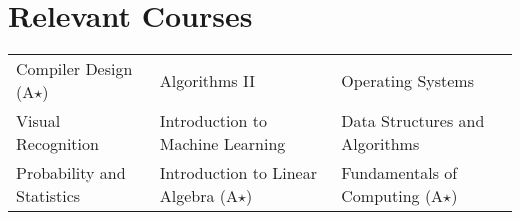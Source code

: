 \section*{Relevant Courses}
\begin{tabularx}{\textwidth}{X X X}
    Compiler Design (A$\star$) &
    Algorithms II &
    Operating Systems \\
    Visual Recognition &
    Introduction to Machine Learning &
    Data Structures and Algorithms \\
    Probability and Statistics &
    Introduction to Linear Algebra (A$\star$) &
    Fundamentals of Computing (A$\star$)
\end{tabularx}
